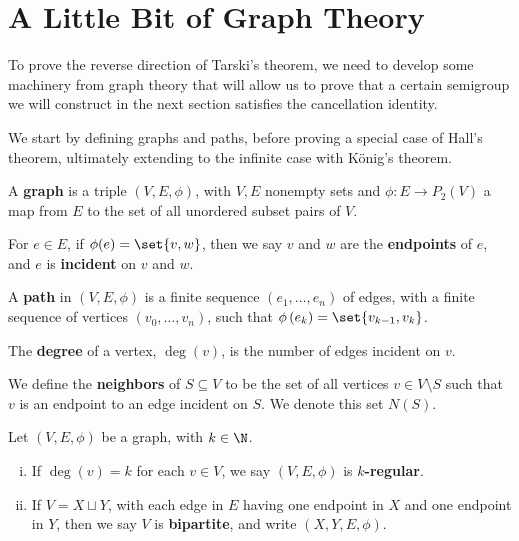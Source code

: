 \section{A Little Bit of Graph Theory}%
To prove the reverse direction of Tarski's theorem, we need to develop some machinery from graph theory that will allow us to prove that a certain semigroup we will construct in the next section satisfies the cancellation identity.\newline

We start by defining graphs and paths, before proving a special case of Hall's theorem, ultimately extending to the infinite case with König's theorem.
\begin{definition}
  A \textbf{graph} is a triple $\left(V,E,\phi\right)$, with $V,E$ nonempty sets and $\phi: E\rightarrow P_{2}(V)$ a map from $E$ to the set of all unordered subset pairs of $V$.\newline

  For $e\in E$, if $\phi(e) = \set{v,w}$, then we say $v$ and $w$ are the \textbf{endpoints} of $e$, and $e$ is \textbf{incident} on $v$ and $w$.\newline

  A \textbf{path} in $\left(V,E,\phi\right)$ is a finite sequence $\left(e_1,\dots,e_n\right)$ of edges, with a finite sequence of vertices $\left(v_0,\dots,v_n\right)$, such that $\phi\left(e_k\right) = \set{v_{k-1},v_k}$.\newline

  The \textbf{degree} of a vertex, $\deg(v)$, is the number of edges incident on $v$.\newline

  We define the \textbf{neighbors} of $S\subseteq V$ to be the set of all vertices $v\in V\setminus S$ such that $v$ is an endpoint to an edge incident on $S$. We denote this set $N(S)$.
\end{definition}

\begin{definition}
  Let $\left(V,E,\phi\right)$ be a graph, with $k\in \N$.
  \begin{enumerate}[(i)]
    \item If $\deg(v) = k$ for each $v\in V$, we say $\left(V,E,\phi\right)$ is \textbf{$k$-regular}.
    \item If $V = X\sqcup Y$, with each edge in $E$ having one endpoint in $X$ and one endpoint in $Y$, then we say $V$ is \textbf{bipartite}, and write $\left(X,Y,E,\phi\right)$.
  \end{enumerate}
\end{definition}

